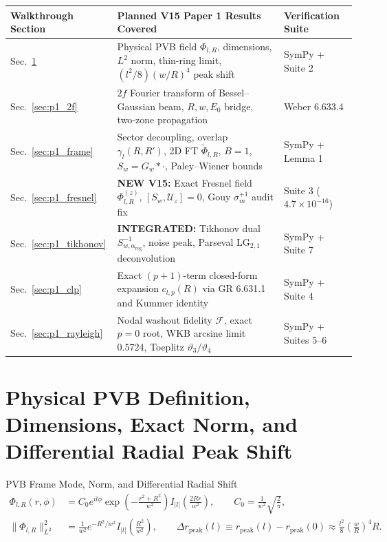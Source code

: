 \documentclass[10pt,letterpaper]{article}
\newcommand{\norm}[1]{\lVert #1 \rVert}
\newcommand{\abs}[1]{\lvert #1 \rvert}
\numberwithin{equation}{section}
\begin{document}
\begin{table}[h]
\centering
\footnotesize
\renewcommand{\arraystretch}{1.14}
\begin{tabular}{@{}lll@{}}
\toprule
\textbf{Walkthrough Section} & \textbf{Planned V15 Paper 1 Results Covered} & \textbf{Verification Suite} \\
\midrule
Sec.~\ref{sec:p1_def} & Physical PVB field $\Phi_{l,R}$, dimensions, $L^2$ norm, thin-ring limit, $(l^2/8)(w/R)^4$ peak shift & SymPy + Suite 2 \\
Sec.~\ref{sec:p1_2f} & $2f$ Fourier transform of Bessel--Gaussian beam, $R, w, E_0$ bridge, two-zone propagation & Weber 6.633.4 \\
Sec.~\ref{sec:p1_frame} & Sector decoupling, overlap $\gamma_l(R,R')$, 2D FT $\widetilde{\Phi}_{l,R}$, $B=1$, $S_w = G_w * \cdot$, Paley--Wiener bounds & SymPy + Lemma 1 \\
Sec.~\ref{sec:p1_fresnel} & \textbf{NEW V15:} Exact Fresnel field $\Phi_{l,R}^{(z)}$, $[S_w,\mathcal{U}_z]=0$, Gouy $\sigma_m^{+1}$ audit fix & Suite 3 ($4.7\times 10^{-16}$) \\
Sec.~\ref{sec:p1_tikhonov} & \textbf{INTEGRATED:} Tikhonov dual $S_{w,\alpha_{\mathrm{reg}}}^{-1}$, noise peak, Parseval $\mathrm{LG}_{2,1}$ deconvolution & SymPy + Suite 7 \\
Sec.~\ref{sec:p1_clp} & Exact $(p+1)$-term closed-form expansion $c_{l,p}(R)$ via GR 6.631.1 and Kummer identity & SymPy + Suite 4 \\
Sec.~\ref{sec:p1_rayleigh} & Nodal washout fidelity $\mathcal{F}$, exact $p=0$ root, WKB arcsine limit $0.5724$, Toeplitz $\vartheta_3/\vartheta_4$ & SymPy + Suites 5--6 \\
\bottomrule
\end{tabular}
\end{table}

\section{Physical PVB Definition, Dimensions, Exact Norm, and Differential Radial Peak Shift}
\label{sec:p1_def}

\begin{targeteq}{PVB Frame Mode, Norm, and Differential Radial Shift}
\begin{align*}
  \Phi_{l,R}(r,\phi) &= C_0 e^{il\phi} \exp\!\left(-\frac{r^2+R^2}{w^2}\right) I_{\abs{l}}\!\left(\frac{2Rr}{w^2}\right), \qquad C_0 = \frac{1}{w^2}\sqrt{\frac{2}{\pi}}, \\
  \norm{\Phi_{l,R}}_{L^2}^2 &= \frac{1}{w^2} e^{-R^2/w^2} I_{\abs{l}}\!\left(\frac{R^2}{w^2}\right), \qquad
  \Delta r_{\mathrm{peak}}(l) \equiv r_{\mathrm{peak}}(l) - r_{\mathrm{peak}}(0) \approx \frac{l^2}{8}\left(\frac{w}{R}\right)^4 R.
\end{align*}
\end{targeteq}
\end{document}
